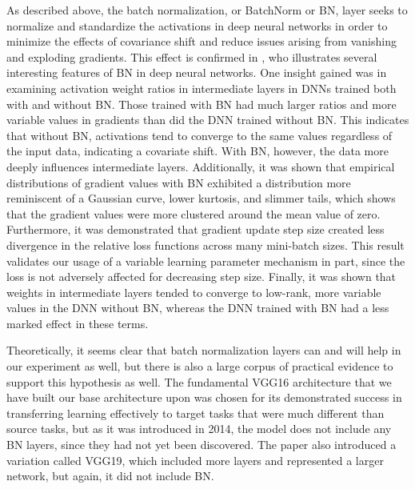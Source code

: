 As described above, the batch normalization, or BatchNorm or BN, layer seeks to normalize and standardize the activations in deep neural networks in order to minimize the effects of covariance shift and reduce issues arising from vanishing and exploding gradients.
This effect is confirmed in \cite{bjorck2018understanding}, who illustrates several interesting features of BN in deep neural networks. 
One insight gained was in examining activation weight ratios in intermediate layers in DNNs trained both with and without BN. 
Those trained with BN had much larger ratios and more variable values in gradients than did the DNN trained without BN.
This indicates that without BN, activations tend to converge to the same values regardless of the input data, indicating a covariate shift.
With BN, however, the data more deeply influences intermediate layers.
Additionally, it was shown that empirical distributions of gradient values with BN exhibited a distribution more reminiscent of a Gaussian curve, lower kurtosis, and slimmer tails, which shows that the gradient values were more clustered around the mean value of zero.
Furthermore, it was demonstrated that gradient update step size created less divergence in the relative loss functions across many mini-batch sizes.
This result validates our usage of a variable learning parameter mechanism in part, since the loss is not adversely affected for decreasing step size.
Finally, it was shown that weights in intermediate layers tended to converge to low-rank, more variable values in the DNN without BN, whereas the DNN trained with BN had a less marked effect in these terms.

Theoretically, it seems clear that batch normalization layers can and will help in our experiment as well, but there is also a large corpus of practical evidence to support this hypothesis as well.
The fundamental VGG16 architecture \cite{simonyan2014very} that we have built our base architecture upon was chosen for its demonstrated success in transferring learning effectively to target tasks that were much different than source tasks, but as it was introduced in 2014, the model does not include any BN layers, since they had not yet been discovered.
The paper also introduced a variation called VGG19, which included more layers and represented a larger network, but again, it did not include BN.

